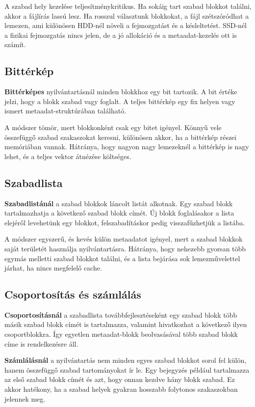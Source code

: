 A szabad hely kezelése teljesítménykritikus. Ha sokáig tart szabad blokkot találni, akkor a fájlírás lassú lesz. Ha rosszul választunk blokkokat, a fájl szétszóródhat a lemezen, ami különösen HDD-nél növeli a fejmozgatást és a késleltetést. SSD-nél a fizikai fejmozgatás nincs jelen, de a jó allokáció és a metaadat-kezelés ott is számít.

\subsection{Bittérkép}

\textbf{Bittérképes} nyilvántartásnál minden blokkhoz egy bit tartozik. A bit értéke jelzi, hogy a blokk szabad vagy foglalt. A teljes bittérkép egy fix helyen vagy ismert metaadat-struktúrában található.

A módszer tömör, mert blokkonként csak egy bitet igényel. Könnyű vele összefüggő szabad szakaszokat keresni, különösen akkor, ha a bittérkép részei memóriában vannak. Hátránya, hogy nagyon nagy lemezeknél a bittérkép is nagy lehet, és a teljes vektor átnézése költséges.

\subsection{Szabadlista}

\textbf{Szabadlistánál} a szabad blokkok láncolt listát alkotnak. Egy szabad blokk tartalmazhatja a következő szabad blokk címét. Új blokk foglalásakor a lista elejéről levehetünk egy blokkot, felszabadításkor pedig visszafűzhetjük a listába.

A módszer egyszerű, és kevés külön metaadatot igényel, mert a szabad blokkok saját területét használja nyilvántartásra. Hátránya, hogy nehezebb gyorsan több egymás melletti szabad blokkot találni, és a lista bejárása sok lemezművelettel járhat, ha nincs megfelelő cache.

\subsection{Csoportosítás és számlálás}

\textbf{Csoportosításnál} a szabadlista továbbfejlesztéseként egy szabad blokk több másik szabad blokk címét is tartalmazza, valamint hivatkozhat a következő ilyen csoportblokkra. Így egyetlen metaadat-blokk beolvasásával több szabad blokk címe is rendelkezésre áll.

\textbf{Számlálásnál} a nyilvántartás nem minden egyes szabad blokkot sorol fel külön, hanem összefüggő szabad tartományokat ír le. Egy bejegyzés például tartalmazza az első szabad blokk címét és azt, hogy onnan kezdve hány blokk szabad. Ez akkor hatékony, ha a szabad helyek gyakran hosszabb folytonos szakaszokban jelennek meg.

